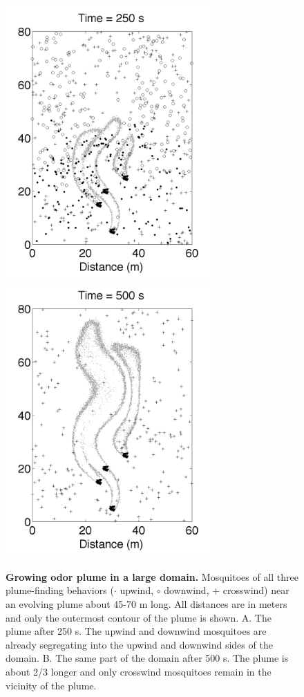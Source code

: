 \documentclass[10pt]{article}
\begin{document}
\begin{figure}[!htp]
\includegraphics[width=3.1in]{revised2figs/Figure7A.png}
\includegraphics[width=3.1in]{revised2figs/Figure7B.png}
\caption{
{\bf Growing odor plume in a large domain.}  Mosquitoes of all three plume-finding behaviors ({\Large $\cdot$} upwind, $\circ$ downwind, $+$ crosswind) near an evolving plume about 45-70 m long. All distances are in meters and only the outermost contour of the plume is shown. A. The plume after 250 s. The upwind and downwind mosquitoes are already segregating into the upwind and downwind sides of the domain. B. The same part of the domain after 500 s. The plume is about 2/3 longer and only crosswind mosquitoes remain in the vicinity of the plume. }
			\label{fig:bigdomain}
\end{figure}
\end{document}
